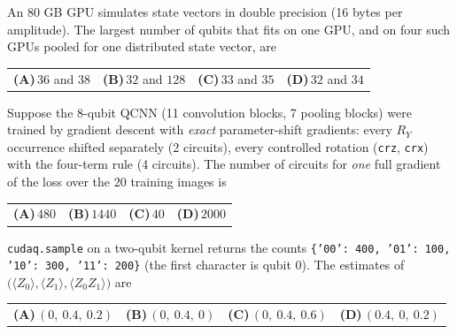\documentclass[11pt,a4paper]{article}
\newcommand{\optlabel}[1]{\textbf{(#1)}}
\newenvironment{qitem}[1]{\begin{list}{}{\setlength{\leftmargin}{3.3em}\setlength{\labelwidth}{3.1em}%
  \setlength{\labelsep}{0.2em}\setlength{\topsep}{3pt}\setlength{\parsep}{3pt}}\item[\textbf{Q.#1}\hfill]}{\end{list}}
\newcommand{\qsep}{\par\vspace{2pt}{\color{black!15}\hrule}\vspace{4pt}}
\begin{document}
\begin{qitem}{65}
An 80 GB GPU simulates state vectors in double precision (16 bytes per amplitude). The largest number of qubits that
fits on one GPU, and on four such GPUs pooled for one distributed state vector, are
\par\smallskip\noindent\begin{tabularx}{\linewidth}{@{}*{4}{L}@{}}
\optlabel{A}\,$36$ and $38$ & \optlabel{B}\,$32$ and $128$ & \optlabel{C}\,$33$ and $35$ & \optlabel{D}\,$32$ and $34$
\end{tabularx}
\end{qitem}
\qsep

\begin{qitem}{66}
Suppose the 8-qubit QCNN (11 convolution blocks, 7 pooling blocks) were trained by gradient descent with \emph{exact}
parameter-shift gradients: every $R_Y$ occurrence shifted separately (2 circuits), every controlled rotation (\texttt{crz}, \texttt{crx})
with the four-term rule (4 circuits). The number of circuits for \emph{one} full gradient of the loss over the 20 training images is
\par\smallskip\noindent\begin{tabularx}{\linewidth}{@{}*{4}{L}@{}}
\optlabel{A}\,$480$ & \optlabel{B}\,$1440$ & \optlabel{C}\,$40$ & \optlabel{D}\,$2000$
\end{tabularx}
\end{qitem}
\qsep

\begin{qitem}{67}
\texttt{cudaq.sample} on a two-qubit kernel returns the counts \texttt{\{'00': 400, '01': 100, '10': 300, '11': 200\}}
(the first character is qubit 0). The estimates of $\big(\langle Z_0\rangle, \langle Z_1\rangle, \langle Z_0Z_1\rangle\big)$ are
\par\smallskip\noindent\begin{tabularx}{\linewidth}{@{}*{4}{L}@{}}
\optlabel{A}\,$(0,\ 0.4,\ 0.2)$ & \optlabel{B}\,$(0,\ 0.4,\ 0)$ & \optlabel{C}\,$(0,\ 0.4,\ 0.6)$ & \optlabel{D}\,$(0.4,\ 0,\ 0.2)$
\end{tabularx}
\end{qitem}
\qsep
\end{document}
